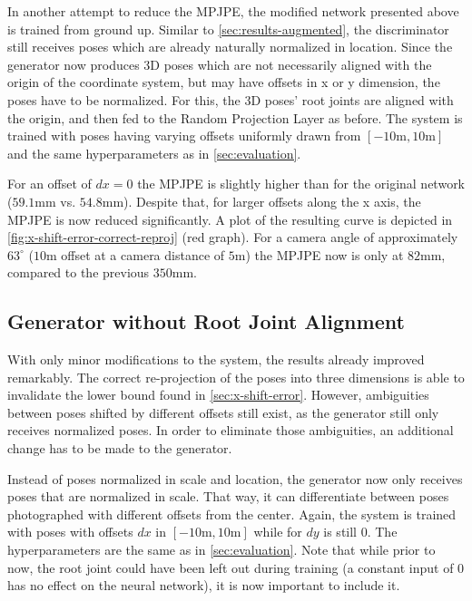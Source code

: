 In another attempt to reduce the MPJPE, the modified network presented above is trained from ground up.
Similar to \autoref{sec:results-augmented}, the discriminator still receives poses which are already naturally normalized in location.
Since the generator now produces 3D poses which are not necessarily aligned with the origin of the coordinate system, but may have offsets in x or y dimension, the poses have to be normalized.
For this, the 3D poses' root joints are aligned with the origin, and then fed to the Random Projection Layer as before.
The system is trained with poses having varying offsets uniformly drawn from $[-10\text{m}, 10\text{m}]$ and the same hyperparameters as in \autoref{sec:evaluation}.

For an offset of $dx = 0$ the MPJPE is slightly higher than for the original network ($59.1$mm vs. $54.8$mm).
Despite that, for larger offsets along the x axis, the MPJPE is now reduced significantly.
A plot of the resulting curve is depicted in \autoref{fig:x-shift-error-correct-reproj} (red graph).
For a camera angle of approximately $63^{\circ}$ ($10$m offset at a camera distance of $5$m) the MPJPE now is only at $82$mm, compared to the previous $350$mm.



\subsection{Generator without Root Joint Alignment}

With only minor modifications to the system, the results already improved remarkably.
The correct re-projection of the poses into three dimensions is able to invalidate the lower bound found in \autoref{sec:x-shift-error}.
However, ambiguities between poses shifted by different offsets still exist, as the generator still only receives normalized poses.
In order to eliminate those ambiguities, an additional change has to be made to the generator.

Instead of poses normalized in scale and location, the generator now only receives poses that are normalized in scale.
That way, it can differentiate between poses photographed with different offsets from the center.
Again, the system is trained with poses with offsets $dx$ in $[-10\text{m}, 10\text{m}]$ while for $dy$ is still $0$.
The hyperparameters are the same as in \autoref{sec:evaluation}.
Note that while prior to now, the root joint could have been left out during training (a constant input of $0$ has no effect on the neural network), it is now important to include it.

